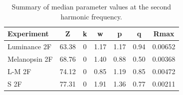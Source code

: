\documentclass[
]{article}
\begin{document}
\begin{table}

\caption{\label{tab:paramtable2F}Summary of median parameter values at the second harmonic frequency.}
\centering
\begin{tabular}[t]{l|c|c|c|c|c|c}
\hline
Experiment & Z & k & w & p & q & Rmax\\
\hline
Luminance 2F & 63.38 & 0 & 1.17 & 1.17 & 0.94 & 0.00652\\
\hline
Melanopsin 2F & 68.76 & 0 & 1.40 & 0.88 & 0.50 & 0.00368\\
\hline
L-M 2F & 74.12 & 0 & 0.85 & 1.19 & 0.85 & 0.00472\\
\hline
S 2F & 77.31 & 0 & 1.91 & 1.36 & 0.77 & 0.00211\\
\hline
\end{tabular}
\end{table}
\end{document}
